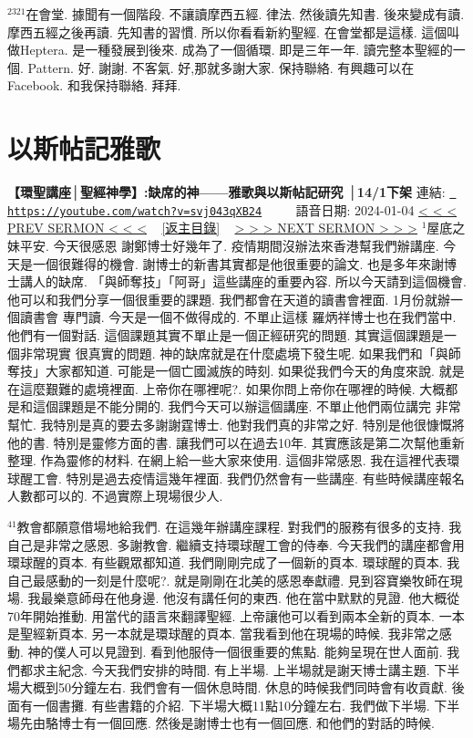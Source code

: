 \documentclass{book}
\begin{document}
$^{2321}$在會堂.
據聞有一個階段.
不讓讀摩西五經.
律法.
然後讀先知書.
後來變成有讀.
摩西五經之後再讀.
先知書的習慣.
所以你看看新約聖經.
在會堂都是這樣.
這個叫做Heptera.
是一種發展到後來.
成為了一個循環.
即是三年一年.
讀完整本聖經的一個.
Pattern.
好.
謝謝.
不客氣.
好,那就多謝大家.
保持聯絡.
有興趣可以在Facebook.
和我保持聯絡.
拜拜.
\newpage



\section{以斯帖記雅歌}
\label{sec:svj043qXB24}
\textbf{【環聖講座│聖經神學】:缺席的神——雅歌與以斯帖記研究 │14/1下架}
\newline
\newline
連結: \href{https://youtube.com/watch?v=svj043qXB24}{\texttt{ https://youtube.com/watch?v=svj043qXB24}} ~~~~ 語音日期: 2024-01-04 
\newline
\newline
\hyperref[sec:WqYP3WEeIPg]{\small{< < < PREV SERMON < < <}}
~
\hyperref[sec:index]{\small{[返主目錄]}}
~
\hyperref[sec:7wbezlnJO0Q]{\small{> > > NEXT SERMON > > >}}
\newline
\newline
$^{1}$屋底之妹平安.
今天很感恩 謝鄭博士好幾年了.
疫情期間沒辦法來香港幫我們辦講座.
今天是一個很難得的機會.
謝博士的新書其實都是他很重要的論文.
也是多年來謝博士講人的缺席.
「與師奪技」「阿哥」這些講座的重要內容.
所以今天請到這個機會.
他可以和我們分享一個很重要的課題.
我們都會在天道的讀書會裡面.
1月份就辦一個讀書會 專門讀.
今天是一個不做得成的.
不單止這樣 羅炳祥博士也在我們當中.
他們有一個對話.
這個課題其實不單止是一個正經研究的問題.
其實這個課題是一個非常現實 很真實的問題.
神的缺席就是在什麼處境下發生呢.
如果我們和「與師奪技」大家都知道.
可能是一個亡國滅族的時刻.
如果從我們今天的角度來說.
就是在這麼艱難的處境裡面.
上帝你在哪裡呢?.
如果你問上帝你在哪裡的時候.
大概都是和這個課題是不能分開的.
我們今天可以辦這個講座.
不單止他們兩位講完 非常幫忙.
我特別是真的要去多謝謝霆博士.
他對我們真的非常之好.
特別是他很慷慨將他的書.
特別是靈修方面的書.
讓我們可以在過去10年.
其實應該是第二次幫他重新整理.
作為靈修的材料.
在網上給一些大家來使用.
這個非常感恩.
我在這裡代表環球醒工會.
特別是過去疫情這幾年裡面.
我們仍然會有一些講座.
有些時候講座報名人數都可以的.
不過實際上現場很少人.

$^{41}$教會都願意借場地給我們.
在這幾年辦講座課程.
對我們的服務有很多的支持.
我自己是非常之感恩.
多謝教會.
繼續支持環球醒工會的侍奉.
今天我們的講座都會用環球醒的頁本.
有些觀眾都知道.
我們剛剛完成了一個新的頁本.
環球醒的頁本.
我自己最感動的一刻是什麼呢?.
就是剛剛在北美的感恩奉獻禮.
見到容寶樂牧師在現場.
我最樂意師母在他身邊.
他沒有講任何的東西.
他在當中默默的見證.
他大概從70年開始推動.
用當代的語言來翻譯聖經.
上帝讓他可以看到兩本全新的頁本.
一本是聖經新頁本.
另一本就是環球醒的頁本.
當我看到他在現場的時候.
我非常之感動.
神的僕人可以見證到.
看到他服侍一個很重要的焦點.
能夠呈現在世人面前.
我們都求主紀念.
今天我們安排的時間.
有上半場.
上半場就是謝天博士講主題.
下半場大概到50分鐘左右.
我們會有一個休息時間.
休息的時候我們同時會有收貢獻.
後面有一個書攤.
有些書籍的介紹.
下半場大概11點10分鐘左右.
我們做下半場.
下半場先由駱博士有一個回應.
然後是謝博士也有一個回應.
和他們的對話的時候.
\end{document}
